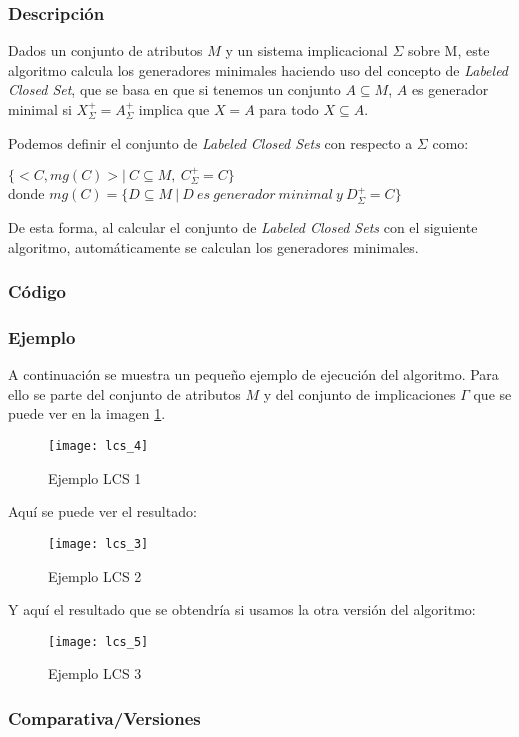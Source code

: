 \subsubsection{Descripci\'on} 
Dados un conjunto de atributos \(M\) y un sistema implicacional \(\Sigma\) sobre M, este algoritmo calcula los generadores minimales haciendo uso del concepto de \textit{Labeled Closed Set}, que se basa en que si tenemos un conjunto \(A \subseteq M\), \(A\) es generador minimal si \(X^+_{\Sigma} = A^+_{\Sigma}\) implica que \(X = A\) para todo  \(X \subseteq A\). 

Podemos definir el conjunto de \textit{Labeled Closed Sets} con respecto a \(\Sigma\) como:
\begin{center}
    \(\{<C,mg(C)> | \ C \subseteq M, \ C^+_{\Sigma} = C \}\)\\
    donde \(mg(C) = \{D \subseteq M \ | \ D \ es \ generador \ minimal \ y \ D^+_{\Sigma} = C \}\)
\end{center}

De esta forma, al calcular el conjunto de \textit{Labeled Closed Sets} con el siguiente algoritmo, autom\'aticamente se calculan los generadores minimales.

\subsubsection{C\'odigo} 

\subsubsection{Ejemplo} 
A continuaci\'on se muestra un peque\~no ejemplo de ejecuci\'on del algoritmo. Para ello se parte del conjunto de atributos \(M\) y del conjunto de implicaciones \(\Gamma\) que se puede ver en la imagen \ref{fig:lcs_4}.
\begin{figure}[H]
    \centering
    \texttt{[image: lcs\_4]}
    \caption{Ejemplo LCS 1}
    \label{fig:lcs_4}
\end{figure} 
Aqu\'i se puede ver el resultado:
\begin{figure}[H]
    \centering
    \texttt{[image: lcs\_3]}
    \caption{Ejemplo LCS 2}
    \label{fig:lcs_3}
\end{figure}
Y aqu\'i el resultado que se obtendr\'ia si usamos la otra versi\'on del algoritmo:
\begin{figure}[H]
    \centering
    \texttt{[image: lcs\_5]}
    \caption{Ejemplo LCS 3}
    \label{fig:lcs_5}
\end{figure}
\subsubsection{Comparativa/Versiones} 